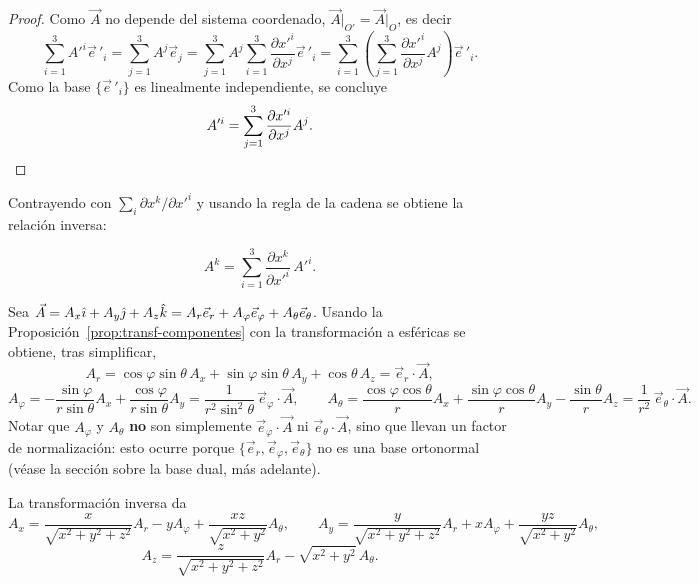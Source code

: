 \begin{proof}
Como $\vec A$ no depende del sistema coordenado, $\vec A\big|_{O'} =
\vec A\big|_O$, es decir
\[
\sum_{i=1}^3 A'^i \vec e\,'_i = \sum_{j=1}^3 A^j \vec e_j =
\sum_{j=1}^3 A^j \sum_{i=1}^3 \frac{\partial x'^i}{\partial x^j}\vec e\,'_i
= \sum_{i=1}^3 \left(\sum_{j=1}^3 \frac{\partial x'^i}{\partial x^j}
A^j\right) \vec e\,'_i .
\]
Como la base $\{\vec e\,'_i\}$ es linealmente independiente, se concluye
\[
A'^i = \sum_{j=1}^3 \frac{\partial x'^i}{\partial x^j} A^j . \qedhere
\]
\end{proof}

Contrayendo con $\sum_i \partial x^k/\partial x'^i$ y usando la regla de
la cadena se obtiene la relación inversa:

\begin{proposicionc}
\[
A^k = \sum_{i=1}^{3} \frac{\partial x^k}{\partial x'^i}\, A'^i .
\]
\end{proposicionc}

\begin{ejemplo}
Sea $\vec A = A_x\hat{\imath} + A_y\hat{\jmath} + A_z\hat{k} = A_r\vec e_r +
A_\varphi\vec e_\varphi + A_\theta\vec e_\theta$. Usando la
Proposición~\ref{prop:transf-componentes} con la transformación a
esféricas se obtiene, tras simplificar,
\[
A_r = \cos\varphi\sin\theta\,A_x + \sin\varphi\sin\theta\,A_y +
\cos\theta\,A_z = \vec e_r\cdot\vec A ,
\]
\[
A_\varphi = -\frac{\sin\varphi}{r\sin\theta}A_x +
\frac{\cos\varphi}{r\sin\theta}A_y = \frac{1}{r^2\sin^2\theta}\,
\vec e_\varphi\cdot\vec A , \qquad
A_\theta = \frac{\cos\varphi\cos\theta}{r}A_x +
\frac{\sin\varphi\cos\theta}{r}A_y - \frac{\sin\theta}{r}A_z =
\frac{1}{r^2}\,\vec e_\theta\cdot\vec A .
\]
Notar que $A_\varphi$ y $A_\theta$ \textbf{no} son simplemente
$\vec e_\varphi\cdot\vec A$ ni $\vec e_\theta\cdot\vec A$, sino que llevan
un factor de normalización: esto ocurre porque $\{\vec e_r,\vec
e_\varphi,\vec e_\theta\}$ no es una base ortonormal (véase la sección
sobre la base dual, más adelante).

La transformación inversa da
\[
A_x = \frac{x}{\sqrt{x^2+y^2+z^2}}A_r - y A_\varphi +
\frac{xz}{\sqrt{x^2+y^2}}A_\theta, \qquad
A_y = \frac{y}{\sqrt{x^2+y^2+z^2}}A_r + x A_\varphi +
\frac{yz}{\sqrt{x^2+y^2}}A_\theta,
\]
\[
A_z = \frac{z}{\sqrt{x^2+y^2+z^2}}A_r - \sqrt{x^2+y^2}\,A_\theta .
\]
\end{ejemplo}

